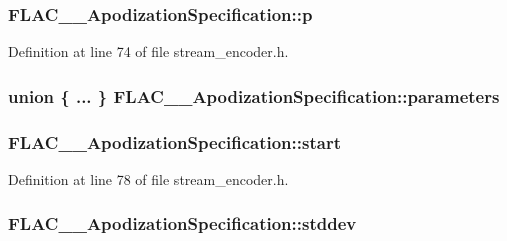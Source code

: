 \subsubsection[{\texorpdfstring{p}{p}}]{ F\+L\+A\+C\+\_\+\+\_\+\+Apodization\+Specification\+::p}\hypertarget{struct_f_l_a_c_____apodization_specification_ac5001c281e463b2d58202cdf8f9deae8}{}\label{struct_f_l_a_c_____apodization_specification_ac5001c281e463b2d58202cdf8f9deae8}


Definition at line 74 of file stream\+\_\+encoder.\+h.

\subsubsection[{\texorpdfstring{parameters}{parameters}}]{\setlength{\rightskip}{0pt plus 5cm}union \{ ... \}   F\+L\+A\+C\+\_\+\+\_\+\+Apodization\+Specification\+::parameters}\hypertarget{struct_f_l_a_c_____apodization_specification_a6ec9874053eb81a76eb291eeb4575d58}{}\label{struct_f_l_a_c_____apodization_specification_a6ec9874053eb81a76eb291eeb4575d58}
\subsubsection[{\texorpdfstring{start}{start}}]{ F\+L\+A\+C\+\_\+\+\_\+\+Apodization\+Specification\+::start}\hypertarget{struct_f_l_a_c_____apodization_specification_a017f737296d93d12526da14f7ed9371b}{}\label{struct_f_l_a_c_____apodization_specification_a017f737296d93d12526da14f7ed9371b}


Definition at line 78 of file stream\+\_\+encoder.\+h.

\subsubsection[{\texorpdfstring{stddev}{stddev}}]{ F\+L\+A\+C\+\_\+\+\_\+\+Apodization\+Specification\+::stddev}\hypertarget{struct_f_l_a_c_____apodization_specification_a6a51fc635757befe6e7542839cac23cb}{}\label{struct_f_l_a_c_____apodization_specification_a6a51fc635757befe6e7542839cac23cb}


